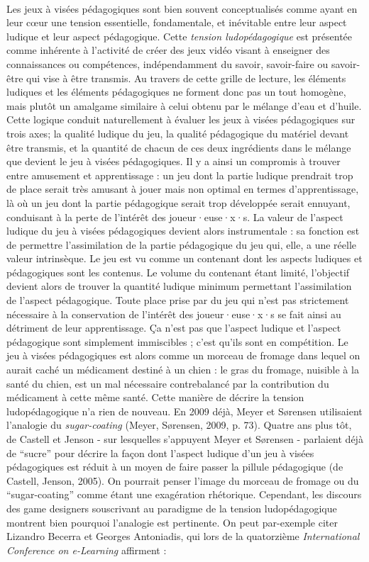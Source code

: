 \documentclass{scrartcl}
\let\emph\relax %
\begin{document}
		\emph{Tension ludopédagogique}\\
		Les jeux à visées pédagogiques sont bien souvent conceptualisés comme ayant en leur cœur une tension essentielle, fondamentale, et inévitable entre leur aspect ludique et leur aspect pédagogique. Cette \textit{tension ludopédagogique} est présentée comme inhérente à l’activité de créer des jeux vidéo visant à enseigner des connaissances ou compétences, indépendamment du savoir, savoir-faire ou savoir-être qui vise à être transmis. Au travers de cette grille de lecture, les éléments ludiques et les éléments pédagogiques ne forment donc pas un tout homogène, mais plutôt un amalgame similaire à celui obtenu par le mélange d’eau et d’huile. Cette logique conduit naturellement à évaluer les jeux à visées pédagogiques sur trois axes; la qualité ludique du jeu, la qualité pédagogique du matériel devant être transmis, et la quantité de chacun de ces deux ingrédients dans le mélange que devient le jeu à visées pédagogiques. Il y a ainsi un compromis à trouver entre amusement et apprentissage : un jeu dont la partie ludique prendrait trop de place serait très amusant à jouer mais non optimal en termes d’apprentissage, là où un jeu dont la partie pédagogique serait trop développée serait ennuyant, conduisant à la perte de l’intérêt des joueur·euse·x·s. La valeur de l’aspect ludique du jeu à visées pédagogiques devient alors instrumentale : sa fonction est de permettre l’assimilation de la partie pédagogique du jeu qui, elle, a une réelle valeur intrinsèque. Le jeu est vu comme un contenant dont les aspects ludiques et pédagogiques sont les contenus. Le volume du contenant étant limité, l’objectif devient alors de trouver la quantité ludique minimum permettant l’assimilation de l’aspect pédagogique. Toute place prise par du jeu qui n’est pas strictement nécessaire à la conservation de l’intérêt des joueur·euse·x·s se fait ainsi au détriment de leur apprentissage. Ça n’est pas que l’aspect ludique et l’aspect pédagogique sont simplement immiscibles ; c’est qu’ils sont en compétition. Le jeu à visées pédagogiques est alors comme un morceau de fromage dans lequel on aurait caché un médicament destiné à un chien : le gras du fromage, nuisible à la santé du chien, est un mal nécessaire contrebalancé par la contribution du médicament à cette même santé. Cette manière de décrire la tension ludopédagogique n'a rien de nouveau. En 2009 déjà, Meyer et Sørensen utilisaient l'analogie du \textit{sugar-coating} (Meyer, Sørensen, 2009, p. 73). Quatre ans plus tôt, de Castell et Jenson - sur lesquelles s'appuyent Meyer et Sørensen - parlaient déjà de “sucre” pour décrire la façon dont l'aspect ludique d'un jeu à visées pédagogiques est réduit à un moyen de faire passer la pillule pédagogique (de Castell, Jenson, 2005). On pourrait penser l'image du morceau de fromage ou du “sugar-coating” comme étant une exagération rhétorique. Cependant, les discours des game designers souscrivant au paradigme de la tension ludopédagogique montrent bien pourquoi l'analogie est pertinente. On peut par-exemple citer Lizandro Becerra et Georges Antoniadis, qui lors de la quatorzième \textit{International Conference on e-Learning} affirment :
\end{document}
